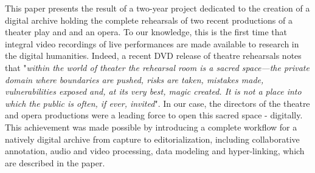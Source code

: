 \documentclass[conference]{IEEEtran}
\newcommand{\todo}[1]{\noindent\textcolor{red}{{\bf \{ToDo} #1{\bf \}}}}
\begin{document}


This paper presents the result of a two-year project dedicated to the creation of a digital archive  holding the complete  rehearsals of  two recent productions of a theater play and and an opera. To our knowledge, this is the first time that integral video recordings of live performances are made available to research in the digital humanities. Indeed, a recent DVD release of theatre rehearsals \cite{Darling07} notes that "{\em within the world of theater the rehearsal room is a sacred space---the private domain where boundaries are pushed, risks are taken, mistakes made, vulnerabilities exposed and, at its very best, magic created. It is not a place into which the public is often, if ever, invited}". In our case, the directors of the theatre and opera productions were a leading force to open this sacred space - digitally.  This achievement was made possible by introducing a  complete workflow for a natively digital archive from capture to editorialization, including collaborative annotation, audio and video processing, data modeling  and hyper-linking, which are described in the paper.





\end{document}
